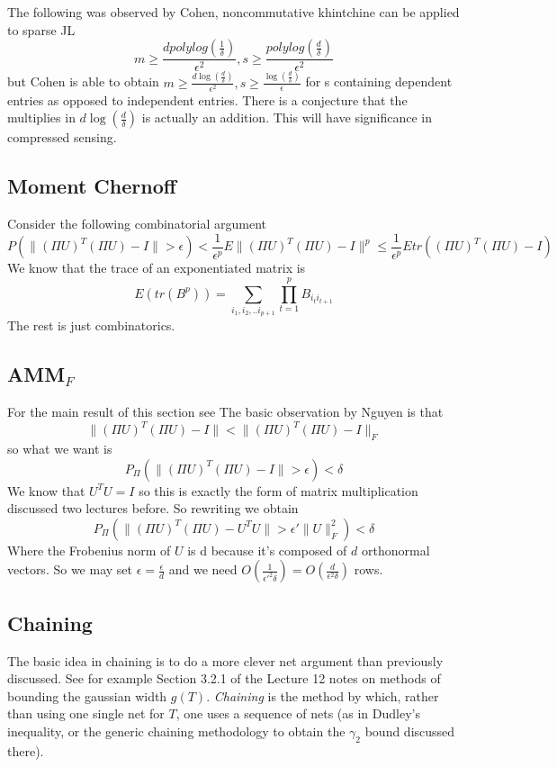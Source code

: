 \documentclass[11pt]{article}
\begin{document}
The following was observed by Cohen, noncommutative khintchine can be applied to sparse JL 
$$m \geq \frac{d polylog(\frac{1}{\delta})}{\epsilon^2}, s\geq \frac{polylog(\frac{d}{\delta})}{\epsilon^2}$$ 
but Cohen is able to obtain 
$m \geq \frac{d \log(\frac{d}{\delta})}{\epsilon^2}, s \geq \frac{\log(\frac{d}{\delta})}{\epsilon}$ for s containing dependent entries as opposed to independent entries.  
There is a conjecture that the multiplies in $d\log(\frac{d}{\delta})$ is actually an addition.  This will have significance in compressed sensing.  

\subsection{Moment Chernoff}
Consider the following combinatorial argument 
$$P(\|(\Pi U)^T(\Pi U) - I\| > \epsilon) < \frac{1}{\epsilon^p}E\|(\Pi U)^T(\Pi U) - I \|^p \leq \frac{1}{\epsilon^p}E tr((\Pi U)^T(\Pi U) - I)$$
We know that the trace of an exponentiated matrix is  
$$E(tr(B^p)) = \sum\limits_{i_1, i_2, ..i_{p+1}} \prod\limits_{t=1}^p B_{{i_t}{i_{t+1}}}$$  
The rest is just combinatorics. 

\subsection{AMM$_F$}
For the main result of this section see \cite{nelson2013lower}
The basic observation by Nguyen is that  
$$\|(\Pi U)^T(\Pi U)  - I \| < \|(\Pi U)^T(\Pi U)  - I \|_F$$  
so what we want is $$P_\Pi(\| (\Pi U)^T(\Pi U)  - I \| > \epsilon) < \delta$$
We know that $U^TU = I$ so this is exactly the form of matrix multiplication discussed two lectures before.  So rewriting we obtain 
$$P_\Pi(\| (\Pi U)^T(\Pi U)  - U^TU \| > \epsilon' \| U\|_F^2) < \delta$$
Where the Frobenius norm of $U$ is d because it's composed of $d$ orthonormal vectors.  So we may set $\epsilon = \frac{\epsilon}{d}$
and we need $O(\frac{1}{\epsilon'^2\delta}) = O(\frac{d}{\epsilon^2\delta})$ rows.  

\subsection{Chaining}
The basic idea in chaining is to do a more clever net argument than previously discussed. See for example Section 3.2.1 of the Lecture 12 notes on methods of bounding the gaussian width $g(T)$. {\em Chaining} is the method by which, rather than using one single net for $T$, one uses a sequence of nets (as in Dudley's inequality, or the generic chaining methodology to obtain the $\gamma_2$ bound discussed there).
\end{document}

